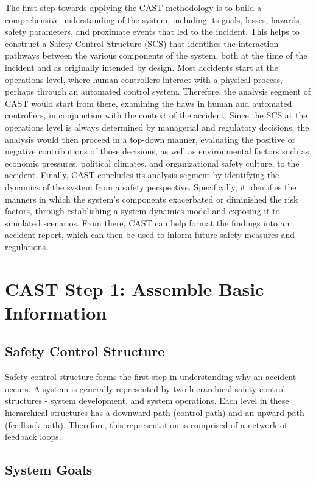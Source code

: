 \documentclass[12pt]{article}
\begin{document}
The first step towards applying the CAST methodology is to build a comprehensive understanding of the system, including its goals, losses, hazards, safety parameters, and proximate events that led to the incident. This helps to construct a Safety Control Structure (SCS) that identifies the interaction pathways between the various components of the system, both at the time of the incident and as originally intended by design. Most accidents start at the operations level, where human controllers interact with a physical process, perhaps through an automated control system. Therefore, the analysis segment of CAST would start from there, examining the flaws in human and automated controllers, in conjunction with the context of the accident. Since the SCS at the operations level is always determined by managerial and regulatory decisions, the analysis would then proceed in a top-down manner, evaluating the positive or negative contributions of those decisions, as well as environmental factors such as economic pressures, political climates, and organizational safety culture, to the accident. Finally, CAST concludes its analysis segment by identifying the dynamics of the system from a safety perspective. Specifically, it identifies the manners in which the system's components exacerbated or diminished the risk factors, through establishing a system dynamics model and exposing it to simulated scenarios. From there, CAST can help format the findings into an accident report, which can then be used to inform future safety measures and regulations.

\section{CAST Step 1: Assemble Basic Information}

\subsection*{Safety Control Structure}

Safety control structure forms the first step in understanding why an accident occurs. A system is generally represented by two hierarchical safety control structures - system development, and system operations. Each level in these hierarchical structures has a downward path (control path) and an upward path (feedback path). Therefore, this representation is comprised of a network of feedback loops.

\subsection{System Goals}
\end{document}
